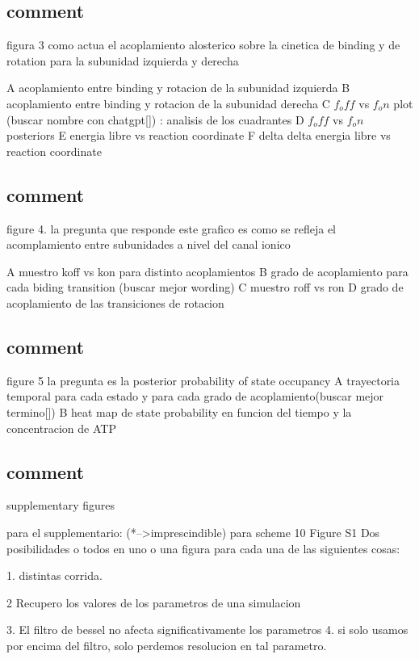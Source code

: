 \documentclass[a4paper,12pt]{article}
\begin{document}
	
	\subsection{comment}
		figura 3 
		como actua el acoplamiento alosterico sobre la cinetica de binding y de rotation para la subunidad izquierda y derecha
		
		A acoplamiento entre binding y rotacion de la subunidad izquierda
		B acoplamiento entre binding y rotacion de la subunidad derecha
		C $f_off$ vs $f_on$ plot (buscar nombre con chatgpt[]) : analisis de los cuadrantes
		D $f_off$ vs $f_on$ posteriors
		E  energia libre vs reaction coordinate 
		F delta delta energia libre vs reaction coordinate
		
	
	
	\subsection{comment}
		figure 4. 
		la pregunta que responde este grafico es como se refleja el acomplamiento entre subunidades a nivel del canal ionico
		
		A muestro koff vs kon para distinto acoplamientos
		B grado de acoplamiento para cada  biding transition (buscar mejor wording)
		C muestro roff vs ron
		D grado de acoplamiento de las transiciones de rotacion
	
	
	\subsection{comment}
		figure 5
		la pregunta es la posterior probability of state occupancy
		A trayectoria temporal para cada estado y para cada grado de acoplamiento(buscar mejor termino[])
		B heat map de state probability en funcion del tiempo y la concentracion de ATP
		
	
	
	
	\subsection{comment}
		supplementary figures
		
		
		para el supplementario: (*-->imprescindible)
		para scheme 10
		Figure S1
		Dos posibilidades o todos en uno o una figura para cada una de las siguientes cosas: 
		
		1. distintas corrida. 
		
		2 Recupero los valores de los parametros de una simulacion
		
		3. El filtro de bessel no afecta significativamente los parametros
		4. si solo usamos por encima del filtro, solo perdemos resolucion en tal parametro. 
		
\end{document}
